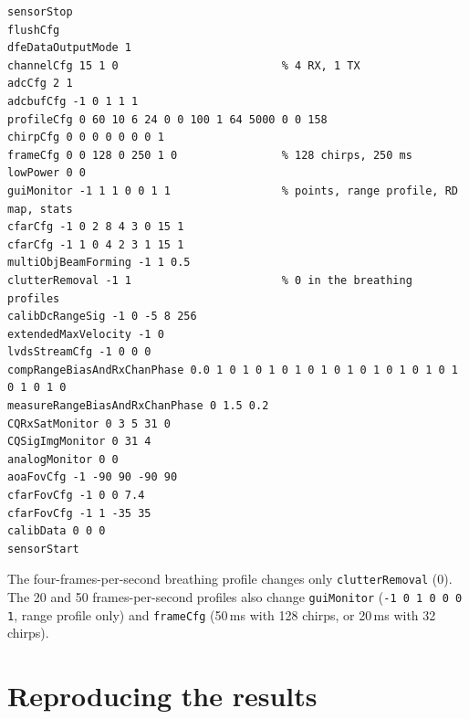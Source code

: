 \documentclass[11pt,a4paper]{article}
\begin{document}
\begin{lstlisting}[language={},basicstyle=\ttfamily\scriptsize]
sensorStop
flushCfg
dfeDataOutputMode 1
channelCfg 15 1 0                         % 4 RX, 1 TX
adcCfg 2 1
adcbufCfg -1 0 1 1 1
profileCfg 0 60 10 6 24 0 0 100 1 64 5000 0 0 158
chirpCfg 0 0 0 0 0 0 0 1
frameCfg 0 0 128 0 250 1 0                % 128 chirps, 250 ms
lowPower 0 0
guiMonitor -1 1 1 0 0 1 1                 % points, range profile, RD map, stats
cfarCfg -1 0 2 8 4 3 0 15 1
cfarCfg -1 1 0 4 2 3 1 15 1
multiObjBeamForming -1 1 0.5
clutterRemoval -1 1                       % 0 in the breathing profiles
calibDcRangeSig -1 0 -5 8 256
extendedMaxVelocity -1 0
lvdsStreamCfg -1 0 0 0
compRangeBiasAndRxChanPhase 0.0 1 0 1 0 1 0 1 0 1 0 1 0 1 0 1 0 1 0 1 0 1 0 1 0
measureRangeBiasAndRxChanPhase 0 1.5 0.2
CQRxSatMonitor 0 3 5 31 0
CQSigImgMonitor 0 31 4
analogMonitor 0 0
aoaFovCfg -1 -90 90 -90 90
cfarFovCfg -1 0 0 7.4
cfarFovCfg -1 1 -35 35
calibData 0 0 0
sensorStart
\end{lstlisting}
The four-frames-per-second breathing profile changes only \texttt{clutterRemoval} (0). The 20 and 50 frames-per-second profiles also change \texttt{guiMonitor} (\texttt{-1 0 1 0 0 0 1}, range profile only) and \texttt{frameCfg} (50\,ms with 128 chirps, or 20\,ms with 32 chirps).

\section{Reproducing the results}\label{app:repro}
\end{document}
